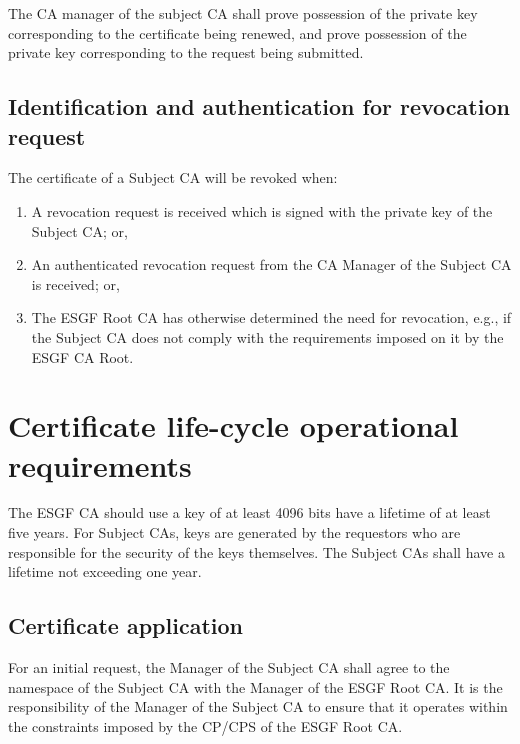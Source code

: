 The CA manager of the subject CA shall prove
possession of the private key corresponding to the certificate being
renewed, and prove possession of the private key corresponding to the
request being submitted.

\subsection{Identification and authentication for revocation request}\label{identification-and-authentication-for-revocation-request}

The certificate of a Subject CA will be revoked when:

\begin{enumerate}
\item
  
  A revocation request is received which is signed with the private key
  of the Subject CA; or,
  
\item
  
  An authenticated revocation request from the CA Manager of the Subject
  CA is received; or,
  
\item
  
  The ESGF Root CA has otherwise determined the need for revocation,
  e.g., if the Subject CA does not comply with the requirements imposed
  on it by the ESGF CA Root.
  
\end{enumerate}

\section{Certificate life-cycle operational requirements}\label{certificate-life-cycle-operational-requirements}

The ESGF CA should use a key of at least 4096 bits have a lifetime of at least five years. For Subject CAs, keys are generated by the requestors who are responsible for the security of the keys themselves. The Subject CAs shall have a lifetime not exceeding one year.

\subsection{Certificate application}\label{certificate-application}

For an initial request, the Manager of the Subject CA shall agree to the
namespace of the Subject CA with the Manager of the ESGF Root CA. It is
the responsibility of the Manager of the Subject CA to ensure that it
operates within the constraints imposed by the CP/CPS of the ESGF Root CA.

